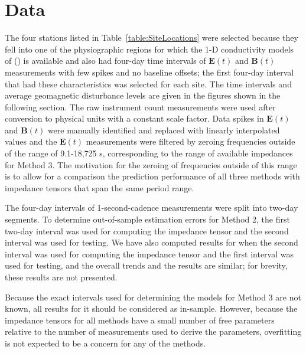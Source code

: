 \documentclass[12pt]{article}
\begin{document}
\section{Data}

The four stations listed in Table~\ref{table:SiteLocations} were selected because they fell into one of the physiographic regions for which the 1-D conductivity models of (\cite{Fernberg2012}) is available and also had four-day time intervals of $\mathbf{E}(t)$ and $\mathbf{B}(t)$ measurements with few spikes and no baseline offsets; the first four-day interval that had these characteristics was selected for each site.  The time intervals and average geomagnetic disturbance levels are given in the figures shown in the following section.  The raw instrument count measurements were used after conversion to physical units with a constant scale factor.  Data spikes in $\mathbf{E}(t)$ and $\mathbf{B}(t)$ were manually identified and replaced with linearly interpolated values and the $\mathbf{E}(t)$ measurements were filtered by zeroing frequencies outside of the range of 9.1-18,725 s, corresponding to the range of available impedances for Method 3.  The motivation for the zeroing of frequencies outside of this range is to allow for a comparison the prediction performance of all three methods with impedance tensors that span the same period range.


The four-day intervals of 1-second-cadence measurements were split into two-day segments.  To determine out-of-sample estimation errors for Method 2, the first two-day interval was used for computing the impedance tensor and the second interval was used for testing. We have also computed results for when the second interval was used for computing the impedance tensor and the first interval was used for testing, and the overall trends and the results are similar; for brevity, these results are not presented.

Because the exact intervals used for determining the models for Method 3 are not known, all results for it should be considered as in-sample. However, because the impedance tensors for all methods have a small number of free parameters relative to the number of measurements used to derive the parameters, overfitting is not expected to be a concern for any of the methods.
\end{document}
